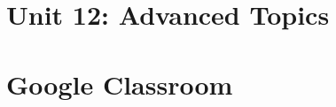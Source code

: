 \documentclass[catalan, a4paper, 12pt, titlepage]{article}
\begin{document}

%





\section{Unit 12: Advanced Topics}




\section{Google Classroom}

\end{document}
